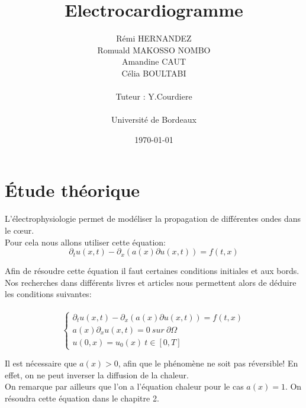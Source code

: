 \documentclass[a4paper,12pt,twoside]{report}
\title{
\vspace*{1in}
\textbf{Electrocardiogramme}}
\author{Rémi HERNANDEZ\\
        Romuald MAKOSSO NOMBO\\
        Amandine CAUT\\
        Célia BOULTABI\\
		\vspace*{0.5in} \\		
		Tuteur : Y.Courdiere \\	
		\vspace*{0.5in} \\		
		Université de Bordeaux\\		
       }
\date{\today} %
\begin{document}
\maketitle %




\pagebreak
\hspace{0pt}

\vfill
\hspace{0pt}
\pagebreak




\cleardoublepage
\tableofcontents %



\chapter{Étude théorique} 

L'électrophysiologie permet de modéliser la propagation de différentes ondes dans le cœur. \\
Pour cela nous allons utiliser cette équation:\\

$$\partial_t u(x,t) - \partial_x(a(x) \partial u(x,t)) = f(t,x)$$

Afin de résoudre cette équation il faut certaines conditions initiales et aux bords. Nos recherches dans différents livres et articles nous permettent alors de déduire les conditions suivantes: \\
\\
$$ 
\left\{ 
	\begin{array}{ll}
		\partial_t u(x,t) - \partial_x(a(x) \partial u(x,t)) = f(t,x) \\
		a(x) \partial_x u(x,t) = 0 \ sur \  \partial \Omega\\
		u(0,x) = u_0(x) \ t \in [0,T]
		
	\end{array}
\right. 
$$


Il est nécessaire que $a(x) > 0$, afin que le phénomène ne soit pas réversible! En effet, on ne peut inverser la diffusion de la chaleur. \\ 
On remarque par ailleurs que l'on a l'équation chaleur pour le cas $a(x) = 1$. On résoudra cette équation dans le chapitre 2.
\end{document}
